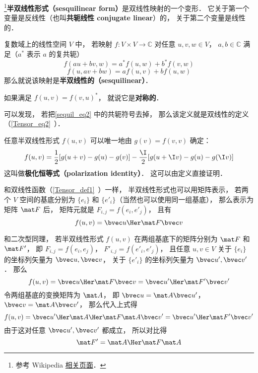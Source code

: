 
\begin{issues}
\issueDraft
\end{issues}

\footnote{参考 Wikipedia \href{https://en.wikipedia.org/wiki/Sesquilinear_form}{相关页面}．}\textbf{半双线性形式（sesquilinear form）}是双线性映射的一个变形． 它关于第一个变量是反线性（也叫\textbf{共轭线性 conjugate linear}）的， 关于第二个变量是线性的．
\begin{definition}{}\label{sequil_def1}
复数域上的线性空间 $V$ 中， 若映射 $f:V\times V\to \mathbb C$ 对任意 $u, v, w\in V$， $a,b\in \mathbb C$ 满足（$a^*$ 表示 $a$ 的复共轭）
\begin{equation}\label{sequil_eq2}
f(au+bv, w) = a^*f(u, w) + b^*f(v, w)
\end{equation}
\begin{equation}\label{sequil_eq1}
f(u, av+bw) = af(u, v) + bf(u, w)
\end{equation}
那么就说该映射是\textbf{半双线性的（sesquilinear）}．
\end{definition}
如果满足 $f(u, v) = f(v, u)^*$， 就说它是\textbf{对称的}．

可以发现， 若把\autoref{sequil_eq2} 中的共轭符号去掉， 那么该定义就是双线性的定义（\autoref{Tensor_eq2}~）．

任意半双线性形式 $f(u, v)$ 可以唯一地由 $g(v) = f(v, v)$ 确定：
\begin{equation}
f(u, v) =\frac{1}{2}[g(u+v)-g(u)-g(v)]
-\frac{\I}{2}[g(u+\I v)-g(u)-g(\I v)]
\end{equation}
这叫做\textbf{极化恒等式（polarization identity）}． 这可以由定义直接证明．

和双线性函数（\autoref{Tensor_def1}~）一样， 半双线性形式也可以用矩阵表示， 若两个 $V$ 空间的基底分别为 $\{e_i\}$ 和 $\{e'_i\}$（当然也可以使用同一组基底）， 那么表示为矩阵 $\mat F$ 后， 矩阵元就是 $F_{i,j} = f(e_i, e'_j)$， 且有
\begin{equation}
f(u, v) = \bvec u\Her \mat F \bvec v
\end{equation}

和二次型同理， 若半双线性形式 $f(u, v)$ 在两组基底下的矩阵分别为 $\mat F$ 和 $\mat F'$， 即 $F_{i,j} = f(e_i, e_j)$， $F'_{i,j} = f(e'_i, e'_j)$， 且任意 $u, v\in V$ 关于 $\{e_i\}$ 的坐标列矢量为 $\bvec u, \bvec v$， 关于 $\{e'_i\}$ 的坐标列矢量为 $\bvec u', \bvec v'$． 那么
\begin{equation}
f(u, v) = \bvec u\Her \mat F \bvec v = \bvec u'\Her \mat F' \bvec v'
\end{equation}
令两组基底的变换矩阵为 $\mat A$， 即 $\bvec u = \mat A\bvec u'$， $\bvec v = \mat A \bvec v'$， 那么代入上式得
\begin{equation}
f(u, v) = \bvec u'\Her \mat A\Her \mat F \mat A\bvec v' = \bvec u'\Her \mat F' \bvec v'
\end{equation}
由于这对任意 $\bvec u', \bvec v'$ 都成立， 所以对比得
\begin{equation}
\mat F' = \mat A\Her \mat F \mat A
\end{equation}



